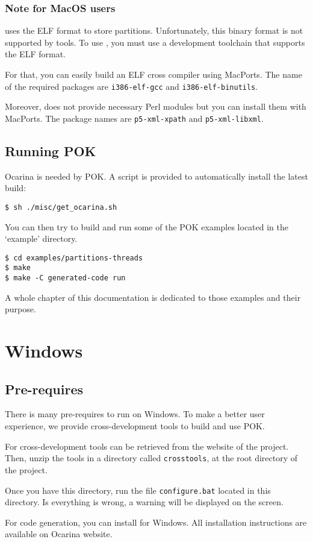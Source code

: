       \subsubsection{Note for MacOS users}
      \pok uses the ELF format to store partitions. Unfortunately, this binary
      format is not supported by \macosx tools. To use \pok, you must use a
      development toolchain that supports the ELF format.

      For that, you can easily build an ELF cross compiler using MacPorts. The
      name of the required packages are \texttt{i386-elf-gcc} and
      \texttt{i386-elf-binutils}.

      Moreover, \macosx does not provide necessary Perl modules but you can
      install them with MacPorts. The package names are \texttt{p5-xml-xpath} and
      \texttt{p5-xml-libxml}.


\subsection{Running POK}

Ocarina is needed by POK. A script is provided to automatically install
the latest build:

\begin{verbatim}
$ sh ./misc/get_ocarina.sh
\end{verbatim}

You can then try to build and run some of the POK examples located in the
`example' directory.

\begin{verbatim}
$ cd examples/partitions-threads
$ make
$ make -C generated-code run
\end{verbatim}

A whole chapter of this documentation is dedicated to those examples and their
purpose.


   \section{Windows}
      \subsection{Pre-requires}
      There is many pre-requires to run \pok on Windows. To make a better user
      experience, we provide cross-development tools to build and use POK.

      For cross-development tools can be retrieved from the website of the
      project. Then, unzip the tools in a directory called \texttt{crosstools},
      at the root directory of the project.

      Once you have this directory, run the file \texttt{configure.bat} located
      in this directory. Is everything is wrong, a warning will be displayed on
      the screen.

      For code generation, you can install \ocarina for Windows. All
      installation instructions are available on Ocarina website.

